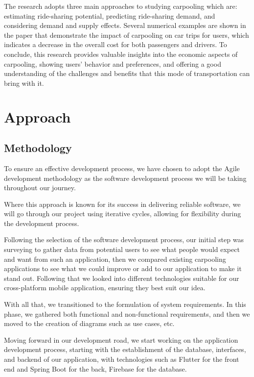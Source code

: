 \documentclass[a4paper, 12pt]{article} %
\begin{document}
                The research adopts three main approaches to studying carpooling which are: estimating ride-sharing potential, predicting ride-sharing demand, and considering demand and supply effects. Several numerical examples are shown in the paper that demonstrate the impact of carpooling on car trips for users, which indicates a decrease in the overall cost for both passengers and drivers.
                To conclude, this research provides valuable insights into the economic aspects of carpooling, showing users’ behavior and preferences, and offering a good understanding of the challenges and benefits that this mode of transportation can bring with it. \cite{carpool_challenge}
    \pagebreak

    \section{Approach}  
        \subsection{Methodology}
            To ensure an effective development process, we have chosen to adopt the Agile development methodology \cite{agile_method} as the software development process we will be taking throughout our journey.
            
            Where this approach is known for its success in delivering reliable software, we will go through our project using iterative cycles, allowing for flexibility during the development process.
            
            Following the selection of the software development process, our initial step was surveying to gather data from potential users to see what people would expect and want from such an application, then we compared existing carpooling applications to see what we could improve or add to our application to make it stand out. Following that we looked into different technologies suitable for our cross-platform mobile application, ensuring they best suit our idea.
            
            With all that, we transitioned to the formulation of system requirements. In this phase, we gathered both functional and non-functional requirements, and then we moved to the creation of diagrams such as use cases, etc.
            
            Moving forward in our development road, we start working on the application development process, starting with the establishment of the database, interfaces, and backend of our application, with technologies such as Flutter for the front end and Spring Boot for the back, Firebase for the database.
            
\end{document}
